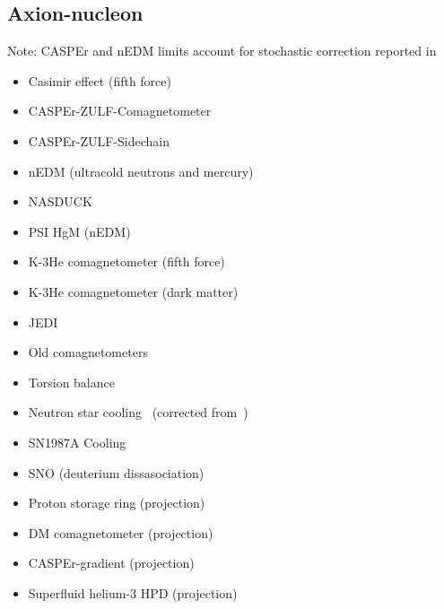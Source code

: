 \documentclass[9pt,twocolumn]{extarticle}
\begin{document}
\begin{mdframed}
\vspace{-1em}
\section{Axion-nucleon}\vspace{-0.5em}
Note: CASPEr and nEDM limits account for stochastic correction reported in~\cite{Centers:2019dyn}
\begin{itemize}\setlength\itemsep{-0.5em}
	\item Casimir effect (fifth force)~\cite{Mostepanenko:2020lqe}
    \item CASPEr-ZULF-Comagnetometer~\cite{Wu:2019exd}
    \item CASPEr-ZULF-Sidechain~\cite{Garcon:2019inh}
    \item nEDM (ultracold neutrons and mercury)~\cite{Abel:2017rtm}
    \item NASDUCK~\cite{Bloch:2021vnn,Bloch:2022kjm}
    \item PSI HgM (nEDM)~\cite{Abel:2022vfg}
    \item K-3He comagnetometer (fifth force)~\cite{Vasilakis2009}
    \item K-3He comagnetometer (dark matter)~\cite{Lee:2022vvb}
    	\item JEDI~\cite{JEDI:2022hxa}
    \item Old comagnetometers~\cite{Bloch:2019lcy}
    \item Torsion balance~\cite{Adelberger:2006dh}
    \item Neutron star cooling~\cite{Buschmann:2021juv} (corrected from~\cite{Beznogov:2018fda})
    \item SN1987A Cooling~\cite{Carenza:2019pxu}
    \item SNO (deuterium dissasociation)~\cite{Bhusal:2020bvx}
    \item Proton storage ring (projection)~\cite{Graham:2020kai}
    \item DM comagnetometer (projection)~\cite{Bloch:2019lcy}
    \item CASPEr-gradient (projection)~\cite{Garcon:2019inh}
    \item Superfluid helium-3 HPD (projection)~\cite{Gao:2022nuq}
\end{itemize}
\end{mdframed}

\newpage
\end{document}
